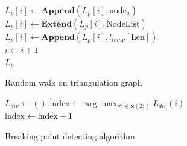 \begin{algorithm}
{{{                $L_p[i] \gets \textbf{Append}(L_p[i], \text{node}_a)$\\
                $L_p[i] \gets \textbf{Extend}(L_p[i], \text{NodeList})$\\
            }
        }
        $L_p[i] \gets \textbf{Append}(L_p[i], l_{temp}[\text{Len}])$\\
        $i \gets i+1$\\
    }
    \Return $L_p$
    \caption{Random walk on triangulation graph}
    \label{alg:randomwalk}
\end{algorithm}


\begin{algorithm}
	$L_{div} \gets ()$ 
	$\text{index} \gets \arg\max_{\forall i \in \textbf{x}(2:)} L_{div}(i)$\\
	$\text{index} \gets \text{index}-1$ 

	\caption{Breaking point detecting algorithm}
	\label{alg:breaking_point}
\end{algorithm}




